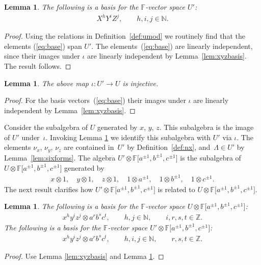\documentclass[pdftex]{sigma}
\numberwithin{equation}{section}
\newtheorem{Lemma}[Theorem]{Lemma}
\begin{document}
\begin{Lemma}
\label{lem:reducedbasis}
The following is a basis for the $\mathbb F$-vector space
$U'$:
\begin{gather}
X^h Y^i Z^j, \qquad h,i,j \in \mathbb N.
\label{eq:base}
\end{gather}
\end{Lemma}
\begin{proof}
Using the relations in
Def\/inition~\ref{def:umod} we routinely f\/ind that
the elements
(\ref{eq:base}) span
$U'$.
The elements~(\ref{eq:base}) are linearly independent,
since
their images under
$\iota$ are linearly independent by
Lemma~\ref{lem:xyzbasis}.
The result follows.
\end{proof}





\begin{Lemma}
\label{lem:injection}
The above map $\iota :
U' \to
U$
is injective.
\end{Lemma}
\begin{proof}\sloppy
For the basis vectors~(\ref{eq:base}) their images under
$\iota$ are linearly independent by
 Lem\-ma~\ref{lem:xyzbasis}.
\end{proof}

Consider the subalgebra of
$U$ generated by $x$, $y$, $z$.
This subalgebra is the image of
$U'$ under~$\iota$. Invoking
 Lemma
\ref{lem:injection} we identify
this subalgebra with $U'$
 via
$\iota$.
The elements $\nu_x$, $\nu_y$, $\nu_z$
are contained in~$U'$
by
Def\/inition~\ref{def:nx}, and~$\Lambda \in U'$
by
Lemma~\ref{lem:sixforms}.
The algebra
$U' \otimes
\mathbb F \lbrack a^{\pm 1}, b^{\pm 1}, c^{\pm 1}\rbrack $
is the subalgebra  of
$U
 \otimes
\mathbb F \lbrack a^{\pm 1}, b^{\pm 1}, c^{\pm 1}\rbrack $
generated by
\begin{gather*}
x \otimes 1, \quad
y \otimes 1, \quad
z \otimes 1, \quad
1 \otimes a^{\pm 1}, \quad
1 \otimes b^{\pm 1}, \quad
1 \otimes c^{\pm 1}.
\end{gather*}
The next result clarif\/ies how
$U' \otimes
\mathbb F \lbrack a^{\pm 1}, b^{\pm 1}, c^{\pm 1}\rbrack $
is related to
$U \otimes
\mathbb F \lbrack a^{\pm 1}, b^{\pm 1}, c^{\pm 1}\rbrack $.

\begin{Lemma}
\label{lem:clarify}
The following is a basis for
the $\mathbb F$-vector space
$U\otimes
\mathbb F \lbrack a^{\pm 1}, b^{\pm 1}, c^{\pm 1}\rbrack $:
\begin{gather*}
x^hy^iz^j \otimes a^r b^s c^t, \qquad h,j\in \mathbb N, \qquad
i,r,s,t \in \mathbb Z.
\end{gather*}
The following is a basis for the
$\mathbb F$-vector space
$U'\otimes
\mathbb F \lbrack a^{\pm 1}, b^{\pm 1}, c^{\pm 1}\rbrack $:
\begin{gather*}
x^hy^iz^j \otimes a^r b^s c^t, \qquad h,i,j\in \mathbb N, \qquad
r,s,t \in \mathbb Z.
\end{gather*}
\end{Lemma}
\begin{proof}
Use Lemma
\ref{lem:xyzbasis} and
Lemma
\ref{lem:reducedbasis}.
\end{proof}
\end{document}
